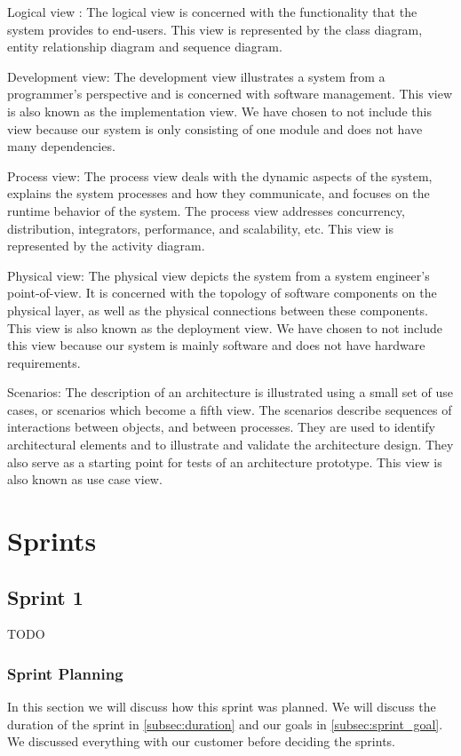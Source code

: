\documentclass{report}
\begin{document}
Logical view : The logical view is concerned with the functionality that the system provides to end-users. This view is represented by the class diagram, entity relationship diagram and sequence diagram.

Development view: The development view illustrates a system from a programmer's perspective and is concerned with software management. This view is also known as the implementation view. We have chosen to not include this view because our system is only consisting of one module and does not have many dependencies.

Process view: The process view deals with the dynamic aspects of the system, explains the system processes and how they communicate, and focuses on the runtime behavior of the system. The process view addresses concurrency, distribution, integrators, performance, and scalability, etc. This view is represented by the activity diagram.

Physical view: The physical view depicts the system from a system engineer's point-of-view. It is concerned with the topology of software components on the physical layer, as well as the physical connections between these components. This view is also known as the deployment view. We have chosen to not include this view because our system is mainly software and does not have hardware requirements.

Scenarios: The description of an architecture is illustrated using a small set of use cases, or scenarios which become a fifth view. The scenarios describe sequences of interactions between objects, and between processes. They are used to identify architectural elements and to illustrate and validate the architecture design. They also serve as a starting point for tests of an architecture prototype. This view is also known as use case view.












\part{Sprints}

\chapter{Sprint 1} \label{cha:sprint_1}
TODO
\section{Sprint Planning} \label{sec:sprint_planning1}
In this section we will discuss how this sprint was planned. We will discuss the duration of the sprint in \ref{subsec:duration} and our goals in \ref{subsec:sprint_goal}. We discussed everything with our customer before deciding the sprints.
\end{document}
